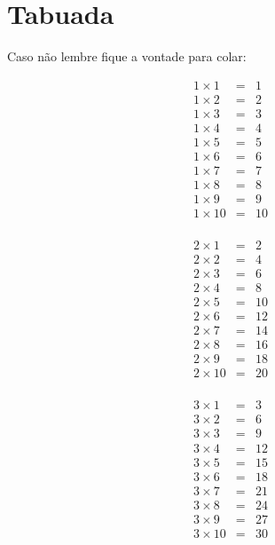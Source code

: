 
\chapter{Tabuada}
Caso não lembre fique a vontade para colar:

\begin{footnotesize}
\begin{multicols}{5}
\begin{eqnarray*}
1 \times 1 &=& 1\\
1 \times 2 &=& 2\\
1 \times 3 &=& 3\\
1 \times 4 &=& 4\\
1 \times 5 &=& 5\\
1 \times 6 &=& 6\\
1 \times 7 &=& 7\\
1 \times 8 &=& 8\\
1 \times 9 &=& 9\\
1 \times 10 &=& 10\\
\end{eqnarray*}

\begin{eqnarray*}
2 \times 1 &=& 2\\
2 \times 2 &=& 4\\
2 \times 3 &=& 6\\
2 \times 4 &=& 8\\
2 \times 5 &=& 10\\
2 \times 6 &=& 12\\
2 \times 7 &=& 14\\
2 \times 8 &=& 16\\
2 \times 9 &=& 18\\
2 \times 10 &=& 20\\
\end{eqnarray*}

\begin{eqnarray*}
3 \times 1 &=& 3\\
3 \times 2 &=& 6\\
3 \times 3 &=& 9\\
3 \times 4 &=& 12\\
3 \times 5 &=& 15\\
3 \times 6 &=& 18\\
3 \times 7 &=& 21\\
3 \times 8 &=& 24\\
3 \times 9 &=& 27\\
3 \times 10 &=& 30\\
\end{eqnarray*}


\end{multicols}
\end{footnotesize}
